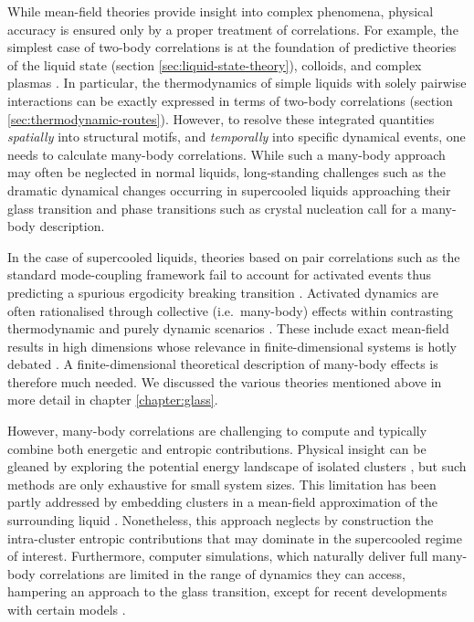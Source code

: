 \documentclass[11pt,twoside]{report}
\begin{document}
While mean-field theories provide insight into complex phenomena, physical accuracy is ensured only by a proper treatment of correlations.
For example, the simplest case of two-body correlations is at the foundation of predictive theories of the liquid state (section \ref{sec:liquid-state-theory}), colloids, and complex plasmas \cite{LikosPR2001,Ivlev2012}.
In particular, the thermodynamics of simple liquids with solely pairwise interactions can be exactly expressed in terms of two-body correlations (section \ref{sec:thermodynamic-routes}).
However, to resolve these integrated quantities \emph{spatially} into structural motifs, and \emph{temporally} into specific dynamical events, one needs to calculate many-body correlations.
While such a many-body approach may often be neglected in normal liquids, long-standing challenges such as the dramatic dynamical changes occurring in supercooled liquids approaching their glass transition \cite{BerthierRMP2011,RoyallPR2015} and phase transitions such as crystal nucleation \cite{RussoSR2012} call for a many-body description.

In the case of supercooled liquids, theories based on pair correlations such as the standard mode-coupling framework \cite{Gotze2009} fail to account for activated events thus predicting a spurious ergodicity breaking transition \cite{BrambillaPRL2009,HallettNC2018}.
Activated dynamics are often rationalised through collective (i.e.\ many-body) effects within contrasting thermodynamic and purely dynamic scenarios \cite{LubchenkoARPC2007,TarjusJPCM2005,BiroliPRL2006,JanssenPRL2015,SzamelPTEP2013,ChandlerARPC2010}.
These include exact mean-field results in high dimensions \cite{ParisiRMP2010,CharbonneauARCMP2017} whose relevance in finite-dimensional systems is hotly debated \cite{WyartPRL2017}.
A finite-dimensional theoretical description of many-body effects is therefore much needed.
We discussed the various theories mentioned above in more detail in chapter \ref{chapter:glass}.

However, many-body correlations are challenging to compute and typically combine both energetic and entropic contributions.
Physical insight can be gleaned by exploring the potential energy landscape of isolated clusters \cite{Wales2004,ArkusPRL2009}, but such methods are only exhaustive for small system sizes.
This limitation has been partly addressed by embedding clusters in a mean-field approximation of the surrounding liquid \cite{MossaJCP2003,MossaJNS2006}.
Nonetheless, this approach neglects by construction the intra-cluster entropic contributions that may dominate in the supercooled regime of interest.
Furthermore, computer simulations, which naturally deliver full many-body correlations are limited in the range of dynamics they can access, hampering an approach to the glass transition, except for recent developments with certain models \cite{BerthierPRL2016}.
\end{document}
